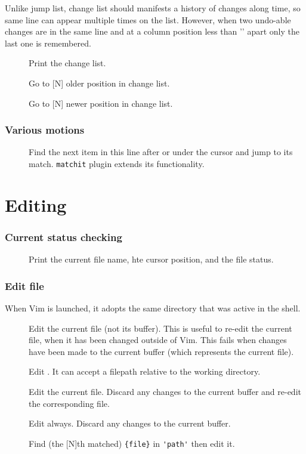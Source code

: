 Unlike jump list, change list should manifests a history of changes along time, so same line can appear multiple times on the list. However, when two undo-able changes are in the same line and at a column position less than '' apart only the last one is remembered.
\begin{description}
  \item[] Print the change list.
  \item[] Go to [N] older position in change list.
  \item[] Go to [N] newer position in change list.
\end{description}
\section{Various motions}
\begin{description}
  \item[\Q{\%}] Find the next item in this line after or under the cursor and jump to its match. \verb|matchit| plugin extends its functionality.
\end{description}
\part{Editing}
\section{Current status checking}
\begin{description}
  \item[] 
  \item[] Print the current file name, hte cursor position, and the file status.
\end{description}
\section{Edit file}
When Vim is launched, it adopts the same directory that was active in the shell.
\begin{description}
  \item[] Edit the current file (not its buffer). This is useful to re-edit the current file, when it has been changed outside of Vim. This fails when changes have been made to the current buffer (which represents the current file).
  \item[] Edit . It can accept a filepath relative to the working directory.
  \item[] Edit the current file. Discard any changes to the current buffer and re-edit the corresponding file.
  \item[] Edit  always. Discard any changes to the current buffer.
  \item[] Find (the [N]th matched) \verb|{file}| in \verb|'path'| then edit it.
\end{description}
